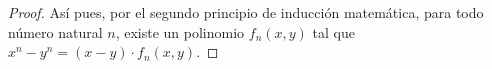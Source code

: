 \begin{ejercicio}
\begin{observacion}
\begin{proof}
            Así pues, por el segundo principio de inducción matemática, para todo número natural $n$, existe un polinomio $f_n(x, y)$ tal que $x^n - y^n = (x-y)\cdot f_n(x, y)$.
            \end{proof}
        \end{observacion}
\end{ejercicio}